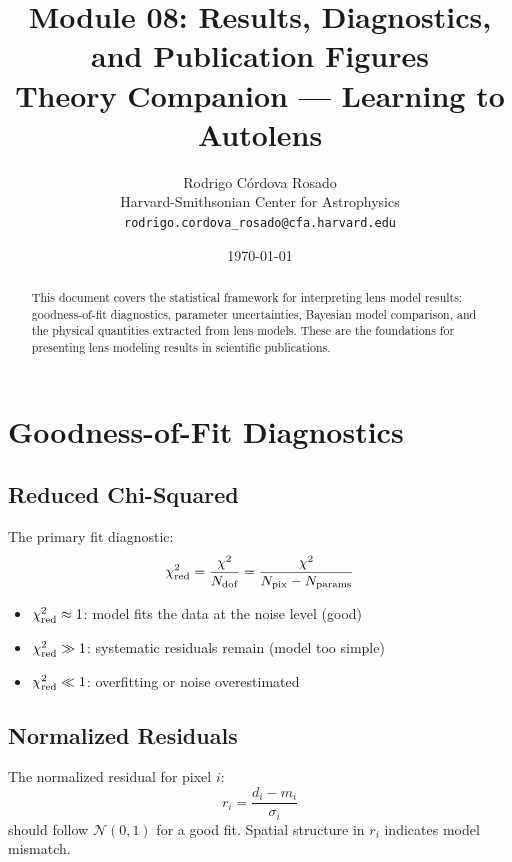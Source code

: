 \documentclass[11pt, letterpaper]{article}
\title{\textbf{Module 08: Results, Diagnostics, and Publication Figures}\\[0.5em]
\large Theory Companion --- Learning to Autolens}
\author{Rodrigo C\'ordova Rosado\\
\small Harvard-Smithsonian Center for Astrophysics\\
\small \texttt{rodrigo.cordova\_rosado@cfa.harvard.edu}}
\date{\today}
\begin{document}
\maketitle

\begin{abstract}
This document covers the statistical framework for interpreting lens
model results: goodness-of-fit diagnostics, parameter uncertainties,
Bayesian model comparison, and the physical quantities extracted from
lens models. These are the foundations for presenting lens modeling
results in scientific publications.
\end{abstract}

\tableofcontents
\newpage

\section{Goodness-of-Fit Diagnostics}

\subsection{Reduced Chi-Squared}

The primary fit diagnostic:
\begin{equation}
\chi^2_{\rm red} = \frac{\chi^2}{N_{\rm dof}} = \frac{\chi^2}{N_{\rm pix} - N_{\rm params}}
\end{equation}

\begin{itemize}[nosep]
  \item $\chi^2_{\rm red} \approx 1$: model fits the data at the noise level (good)
  \item $\chi^2_{\rm red} \gg 1$: systematic residuals remain (model too simple)
  \item $\chi^2_{\rm red} \ll 1$: overfitting or noise overestimated
\end{itemize}

\subsection{Normalized Residuals}

The normalized residual for pixel $i$:
\begin{equation}
r_i = \frac{d_i - m_i}{\sigma_i}
\end{equation}
should follow $\mathcal{N}(0, 1)$ for a good fit. Spatial structure in
$r_i$ indicates model mismatch.
\end{document}
